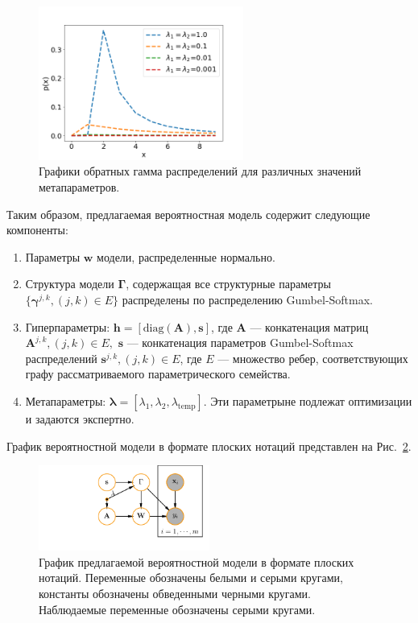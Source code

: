 \begin{figure}
\centering
\includegraphics[width=0.6\textwidth]{plots/notebooks/invgamma.png}
\caption{Графики обратных гамма распределений для различных значений метапараметров.}
\label{fig:inv-gamma}
\end{figure}


Таким образом, предлагаемая вероятностная модель содержит следующие компоненты:
\begin{enumerate}
\item Параметры $\mathbf{w}$ модели, распределенные нормально.
\item Структура модели $\boldsymbol{\Gamma}$, содержащая все структурные параметры $\{\boldsymbol{\gamma}^{j,k}, (j,k) \in E\}$ распределены по распределению Gumbel-Softmax.
\item Гиперпараметры: $\mathbf{h} = [\text{diag}(\mathbf{A}), \mathbf{s}]$, где $\mathbf{A}$ --- конкатенация матриц $\mathbf{A}^{j,k}, (j,k) \in E,$ $\mathbf{s}$ --- конкатенация параметров Gumbel-Softmax распределений $\mathbf{s}^{j,k}, (j,k) \in E$, где $E$ --- множество ребер, соответствующих графу рассматриваемого параметрического семейства.
\item Метапараметры: $\boldsymbol{\lambda} = [\lambda_1, \lambda_2, \lambda_\text{temp}].$ Эти параметрыне подлежат оптимизации и задаются экспертно. 
\end{enumerate}

График вероятностной модели в формате плоских нотаций представлен на Рис.~\ref{fig:plate_prob}.
\begin{figure}
\centering
   \includegraphics[width=0.5\textwidth]{plots/notebooks/simple_plate.pdf}
\caption{График предлагаемой вероятностной модели в формате плоских нотаций. Переменные обозначены белыми и серыми кругами, константы обозначены обведенными черными кругами. Наблюдаемые переменные обозначены серыми кругами.}
\label{fig:plate_prob}
\end{figure}

